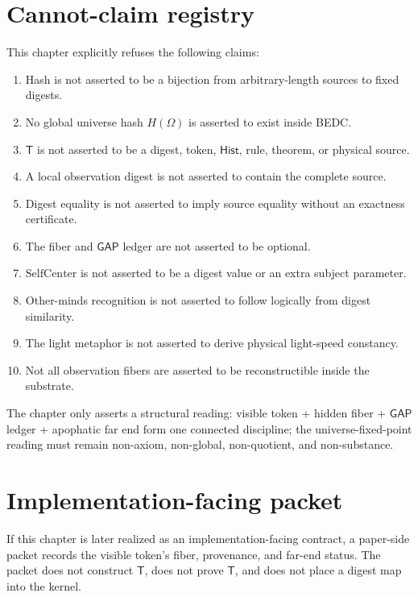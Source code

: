 \section{Cannot-claim registry}
\label{sec:hash-like-cannot-claim}

This chapter explicitly refuses the following claims:

\begin{enumerate}
\item Hash is not asserted to be a bijection from arbitrary-length sources to fixed digests.
\item No global universe hash $H(\Omega)$ is asserted to exist inside BEDC.
\item $\mathsf{T}$ is not asserted to be a digest, token, $\mathsf{Hist}$, rule, theorem, or physical source.
\item A local observation digest is not asserted to contain the complete source.
\item Digest equality is not asserted to imply source equality without an exactness certificate.
\item The fiber and $\mathsf{GAP}$ ledger are not asserted to be optional.
\item $\mathrm{SelfCenter}$ is not asserted to be a digest value or an extra subject parameter.
\item Other-minds recognition is not asserted to follow logically from digest similarity.
\item The light metaphor is not asserted to derive physical light-speed constancy.
\item Not all observation fibers are asserted to be reconstructible inside the substrate.
\end{enumerate}

The chapter only asserts a structural reading: visible token + hidden fiber + $\mathsf{GAP}$ ledger + apophatic far end form one connected discipline; the universe-fixed-point reading must remain non-axiom, non-global, non-quotient, and non-substance.

\section{Implementation-facing packet}
\label{sec:hash-like-implementation-packet}

If this chapter is later realized as an implementation-facing contract, a paper-side packet records the visible token's fiber, provenance, and far-end status. The packet does not construct $\mathsf{T}$, does not prove $\mathsf{T}$, and does not place a digest map into the kernel.

